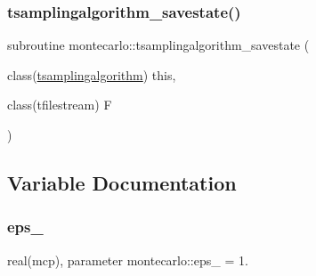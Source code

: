 \mbox{\label{namespacemontecarlo_a78f12d9f7d6f2a3ac0d492a9b3d7ec9a}} 
\subsubsection{\texorpdfstring{tsamplingalgorithm\+\_\+savestate()}{tsamplingalgorithm\_savestate()}}
{\footnotesize\ttfamily subroutine montecarlo\+::tsamplingalgorithm\+\_\+savestate (\begin{DoxyParamCaption}\item[{class(\mbox{\hyperlink{structmontecarlo_1_1tsamplingalgorithm}{tsamplingalgorithm}})}]{this,  }\item[{class(tfilestream)}]{F }\end{DoxyParamCaption})\hspace{0.3cm}{\ttfamily [private]}}



\subsection{Variable Documentation}
\mbox{\label{namespacemontecarlo_ac87b0e5ba62e656a1e0d3317a890c0d9}} 
\subsubsection{\texorpdfstring{eps\+\_}{eps\_1}}
{\footnotesize\ttfamily real(mcp), parameter montecarlo\+::eps\+\_ = 1.\hspace{0.3cm}{\ttfamily [private]}}

